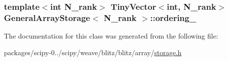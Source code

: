 \subsubsection[{ordering\+\_\+}]{\setlength{\rightskip}{0pt plus 5cm}template$<$int N\+\_\+rank$>$ {\bf Tiny\+Vector}$<$int, N\+\_\+rank$>$ {\bf General\+Array\+Storage}$<$ N\+\_\+rank $>$\+::ordering\+\_\+\hspace{0.3cm}{\ttfamily [protected]}}\label{classGeneralArrayStorage_a6e1df589988683dce2043e9a44eed15b}


The documentation for this class was generated from the following file\+:\begin{DoxyCompactItemize}
\item 
packages/scipy-\/0../scipy/weave/blitz/blitz/array/\hyperlink{storage_8h}{storage.\+h}\end{DoxyCompactItemize}
